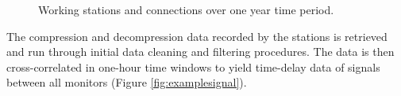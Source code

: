 \documentclass[12pt, sumlimits, intlimits]{article}
\begin{document}
\begin{figure}[ht] 
	\centering 
	\caption{Working stations and connections over one year time period. }
	\label{fig:workingmonitors}
\end{figure}

The compression and decompression data recorded by the stations is retrieved and run through initial data cleaning and filtering procedures. The data is then cross-correlated in one-hour time windows to yield time-delay data of signals between all monitors (Figure \ref{fig:examplesignal}). 
\end{document}
